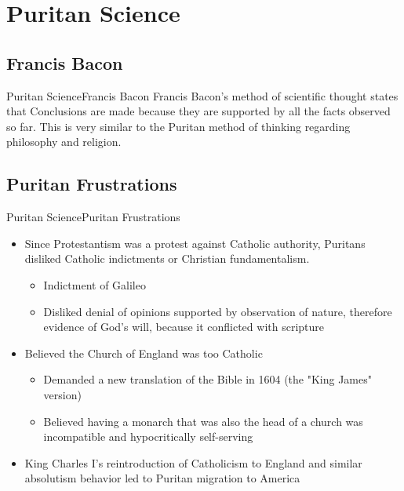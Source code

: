 \section{Puritan Science}
\subsection{Francis Bacon}
\begin{frame}{Puritan Science}{Francis Bacon}
	Francis Bacon's method of scientific thought states that Conclusions are made because they are supported by all the facts observed so far. This is very similar to the Puritan method of thinking regarding philosophy and religion.
\end{frame}

\subsection{Puritan Frustrations}
\begin{frame}{Puritan Science}{Puritan Frustrations}
	\begin{itemize}
		\item Since Protestantism was a protest against Catholic authority, Puritans disliked Catholic indictments or Christian fundamentalism.
			\begin{itemize}
				\item Indictment of Galileo
				\item Disliked denial of opinions supported by observation of nature, therefore evidence of God's will, because it conflicted with scripture
			\end{itemize}
		\item Believed the Church of England was too Catholic
			\begin{itemize}
				\item Demanded a new translation of the Bible in 1604 (the "King James" version)
				\item Believed having a monarch that was also the head of a church was incompatible and hypocritically self-serving
			\end{itemize}
		\item King Charles I's reintroduction of Catholicism to England and similar absolutism behavior led to Puritan migration to America
	\end{itemize}
\end{frame}

